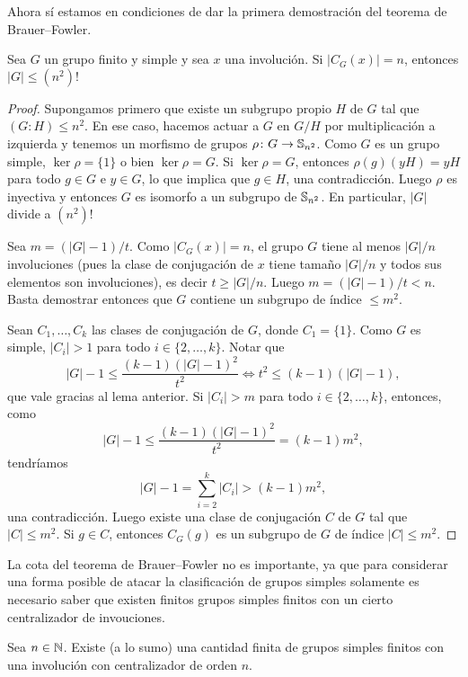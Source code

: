 Ahora sí estamos en condiciones de dar la primera demostración del teorema de
Brauer--Fowler. 

\begin{theorem}
Sea $G$ un grupo finito y simple y sea $x$ una involución. Si $|C_G(x)|=n$, entonces $|G|\leq (n^2)!$	
\end{theorem}

\begin{proof}
Supongamos primero que existe un subgrupo propio $H$ de $G$ tal que
$(G:H)\leq n^2$. En ese caso, hacemos actuar a $G$ en $G/H$ por multiplicación a izquierda 
y tenemos un morfismo de grupos $\rho\colon G\to\mathbb{S}_{n^2}$. Como $G$ es un grupo simple, 
$\ker\rho=\{1\}$ o bien $\ker\rho=G$. Si $\ker\rho=G$, entonces $\rho(g)(yH)=yH$ para todo
$g\in G$ e $y\in G$, lo que implica que $g\in H$, una contradicción. Luego $\rho$ es inyectiva
y entonces $G$ es isomorfo a un subgrupo de $\mathbb{S}_{n^2}$. En particular, $|G|$ divide a $(n^2)!$

Sea $m=(|G|-1)/t$. 
Como $|C_G(x)|=n$, el grupo $G$ tiene al menos $|G|/n$ involuciones (pues la clase de conjugación
de $x$ tiene tamaño $|G|/n$ y todos sus elementos son involuciones), es decir $t\geq |G|/n$. Luego
$m=(|G|-1)/t<n$. Basta demostrar entonces que $G$ contiene un subgrupo de índice $\leq m^2$. 

Sean $C_1,\dots,C_k$ las clases de conjugación de $G$, donde $C_1=\{1\}$. 
Como $G$ es simple, $|C_i|>1$ 
para todo $i\in\{2,\dots,k\}$. Notar que 
\[
|G|-1\leq\frac{(k-1)(|G|-1)^2}{t^2}\Longleftrightarrow t^2\leq(k-1)(|G|-1),
\]
que vale gracias al lema anterior. 
Si $|C_i|>m$ para todo $i\in\{2,\dots,k\}$, entonces, como
\[
|G|-1\leq\frac{(k-1)(|G|-1)^2}{t^2}=(k-1)m^2,
\]
tendríamos 
\[
|G|-1=\sum_{i=2}^k|C_i|>(k-1)m^2,
\]
una contradicción. Luego existe una clase de conjugación $C$ de $G$ tal que $|C|\leq m^2$. Si $g\in C$, entonces
$C_G(g)$ es un subgrupo de $G$ de índice $|C|\leq m^2$.
\end{proof}

La cota del teorema de Brauer--Fowler no es importante, ya que
para considerar una forma posible de atacar la clasificación de grupos simples 
solamente es necesario saber que existen  
finitos grupos simples finitos con un cierto centralizador de invouciones.

\begin{corollary}
Sea $n\in\mathbb{N}$. Existe (a lo sumo) una cantidad finita de grupos simples 
finitos con una involución con centralizador de orden $n$. 
\end{corollary}

